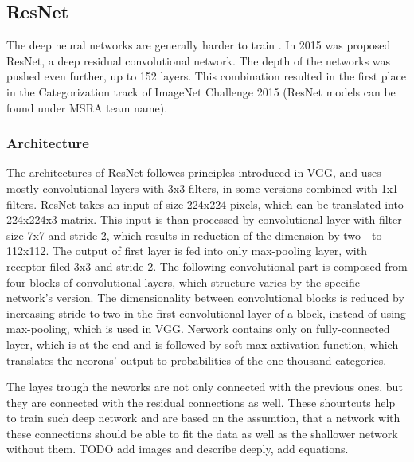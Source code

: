 

\subsection{ResNet}
The deep neural networks are generally harder to train \cite{HardDnn}. In 2015 was proposed ResNet\cite{ResNet}, 
a deep residual convolutional network. The depth of the networks was pushed even further, up to 152 layers. 
This combination resulted in the first place in the Categorization track of ImageNet Challenge 2015\cite{IN2015}
(ResNet models can be found under MSRA team name).

\subsubsection{Architecture}
The architectures of ResNet followes principles introduced in VGG, and uses mostly convolutional
layers with 3x3 filters, in some versions combined with 1x1 filters. ResNet takes an input of
size 224x224 pixels, which can be translated into 224x224x3 matrix. This input is than processed
by convolutional layer with filter size 7x7 and stride 2, which results in reduction of the 
dimension by two - to 112x112. The output of first layer is fed into only max-pooling layer,
with receptor filed 3x3 and stride 2. The following convolutional part is composed from four
blocks of convolutional layers, which structure varies by the specific network's version.
The dimensionality between convolutional blocks is reduced by increasing stride to two
in the first convolutional layer of a block, instead of using max-pooling, which is used in VGG.
Nerwork contains only on fully-connected layer, which is at the end and is followed by 
soft-max axtivation function, which translates the neorons' output to probabilities of the
one thousand categories.


The layes trough the neworks are not only connected with the previous ones, but 
they are connected with the residual connections as well. These shourtcuts help to
train such deep network and are based on the assumtion, that a network with these
connections should be able to fit the data as well as the shallower network without them.
TODO add images and describe deeply, add equations. 





